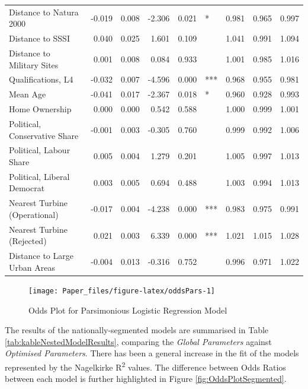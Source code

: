 \documentclass[a4paper,]{article}
\theoremstyle{definition}
\theoremstyle{definition}
\theoremstyle{definition}
\theoremstyle{remark}
\begin{document}
\begin{table}[!h]
{\begin{tabular}[t]{lrrrrlrrr}
Distance to Natura 2000 & -0.019 & 0.008 & -2.306 & 0.021 & * & 0.981 & 0.965 & 0.997\\
Distance to SSSI & 0.040 & 0.025 & 1.601 & 0.109 &  & 1.041 & 0.991 & 1.094\\
\addlinespace
Distance to Military Sites & 0.001 & 0.008 & 0.084 & 0.933 &  & 1.001 & 0.985 & 1.016\\
Qualifications, L4 & -0.032 & 0.007 & -4.596 & 0.000 & *** & 0.968 & 0.955 & 0.981\\
Mean Age & -0.041 & 0.017 & -2.367 & 0.018 & * & 0.960 & 0.928 & 0.993\\
Home Ownership & 0.000 & 0.000 & 0.542 & 0.588 &  & 1.000 & 0.999 & 1.001\\
Political, Conservative Share & -0.001 & 0.003 & -0.305 & 0.760 &  & 0.999 & 0.992 & 1.006\\
\addlinespace
Political, Labour Share & 0.005 & 0.004 & 1.279 & 0.201 &  & 1.005 & 0.997 & 1.013\\
Political, Liberal Democrat & 0.003 & 0.005 & 0.694 & 0.488 &  & 1.003 & 0.994 & 1.013\\
Nearest Turbine (Operational) & -0.017 & 0.004 & -4.238 & 0.000 & *** & 0.983 & 0.975 & 0.991\\
Nearest Turbine (Rejected) & 0.021 & 0.003 & 6.339 & 0.000 & *** & 1.021 & 1.015 & 1.028\\
Distance to  Large Urban Areas & -0.004 & 0.013 & -0.316 & 0.752 &  & 0.996 & 0.971 & 1.022\\
\bottomrule
\end{tabular}}
\end{table}

\begin{figure}[h]

{\centering \texttt{[image: Paper\_files/figure-latex/oddsPars-1]} 

}

\caption{Odds Plot for Parsimonious Logistic Regression Model}\label{fig:oddsPars}
\end{figure}

The results of the nationally-segmented models are summarised in Table
\ref{tab:kableNestedModelResults}, comparing the \emph{Global
Parameters} against \emph{Optimised Parameters}. There has been a
general increase in the fit of the models represented by the Nagelkirke
R\textsuperscript{2} values. The difference between Odds Ratios between
each model is further highlighted in Figure \ref{fig:OddsPlotSegmented}.
\end{document}
